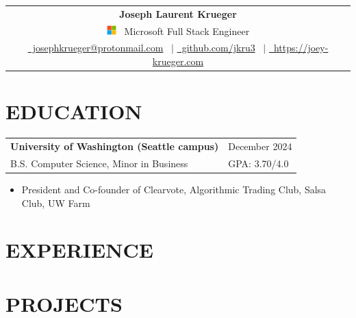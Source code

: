 \documentclass[10.5pt,letterpaper]{article}
\makeatletter
\newcommand{\header}[2]{
    \noindent
    \begin{tabularx}{\linewidth}{@{} C @{}}
        \Huge\textbf{Joseph Laurent Krueger} \\[5pt]
        #1 \ {\Large #2} \\[5pt]
        \href{mailto:josephfkrueger@protonmail.com}{{\color{primarycolor}\faEnvelope}\ josephkrueger@protonmail.com} \ $|$ 
        \href{https://github.com/jkru3}{{\color{primarycolor}\faGithub}\ github.com/jkru3} \ $|$ 
        \href{https://joey-krueger.com}{{\color{primarycolor}\faGlobeAmericas}\ https://joey-krueger.com}
    \end{tabularx}
}
\newcommand{\educationentry}[4]{
    \begin{tabularx}{\textwidth}{lX}
        \textbf{#1} & \hfill {\textcolor{primarycolor}{#3}} \\[0pt]
        #2 & \hfill #4 \\[0pt]
    \end{tabularx}
}
\makeatother
\begin{document}
\header{\includegraphics[height=1em]{../logos/microsoft.png}}{Microsoft Full Stack Engineer}
\vspace{-10pt}

\section{\faGraduationCap{ }EDUCATION}
\vspace{4pt}
\educationentry{University of Washington (Seattle campus)}{B.S. Computer Science, Minor in Business}{December 2024}{GPA: 3.70/4.0}
\begin{itemize}[leftmargin=2em, nosep, noitemsep] %
    \item[] President and Co-founder of Clearvote, Algorithmic Trading Club, Salsa Club, UW Farm
\end{itemize}
\vspace{-10pt}

\section{\faCode{ }EXPERIENCE}
\vspace{4pt}




\vspace{-10pt}

\section{\faFolderOpen{ }PROJECTS}
\vspace{3pt}



\vspace{-20pt}
\end{document}
